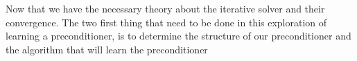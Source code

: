 Now that we have the necessary theory about the iterative solver and their convergence. The two first thing that need to be done in this exploration of learning a preconditioner, is to determine the structure of our preconditioner and the algorithm that will learn the preconditioner

